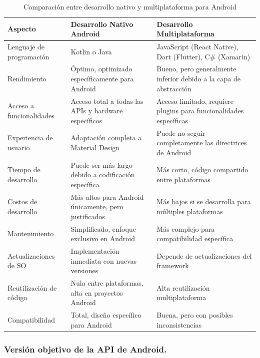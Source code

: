 \begin{table}[H]
\centering
\caption{Comparación entre desarrollo nativo y multiplataforma para Android}
\label{tab:comparacion_nativo_multiplataforma}
\begin{tabular}{|p{}|p{}|p{}|}
\hline
\textbf{Aspecto}{\cellcolor[gray]{0.9}} & \textbf{Desarrollo Nativo Android}{\cellcolor[gray]{0.9}} & \textbf{Desarrollo Multiplataforma}{\cellcolor[gray]{0.9}} \\
\hline
Lenguaje de programación & Kotlin o Java & JavaScript (React Native), Dart (Flutter), C\# (Xamarin) \\
\hline
Rendimiento & Óptimo, optimizado específicamente para Android & Bueno, pero generalmente inferior debido a la capa de abstracción \\
\hline
Acceso a funcionalidades & Acceso total a todas las APIs y hardware específicos & Acceso limitado, requiere plugins para funcionalidades específicas \\
\hline
Experiencia de usuario & Adaptación completa a Material Design & Puede no seguir completamente las directrices de Android \\
\hline
Tiempo de desarrollo & Puede ser más largo debido a codificación específica & Más corto, código compartido entre plataformas \\
\hline
Costos de desarrollo & Más altos para Android únicamente, pero justificados & Más bajos si se desarrolla para múltiples plataformas \\
\hline
Mantenimiento & Simplificado, enfoque exclusivo en Android & Más complejo para compatibilidad específica \\
\hline
Actualizaciones de SO & Implementación inmediata con nuevas versiones & Depende de actualizaciones del framework \\
\hline
Reutilización de código & Nula entre plataformas, alta en proyectos Android & Alta reutilización multiplataforma \\
\hline
Compatibilidad & Total, diseño específico para Android & Buena, pero con posibles inconsistencias \\
\hline
\end{tabular}
\end{table}

\subsubsection{Versión objetivo de la API de Android.}


